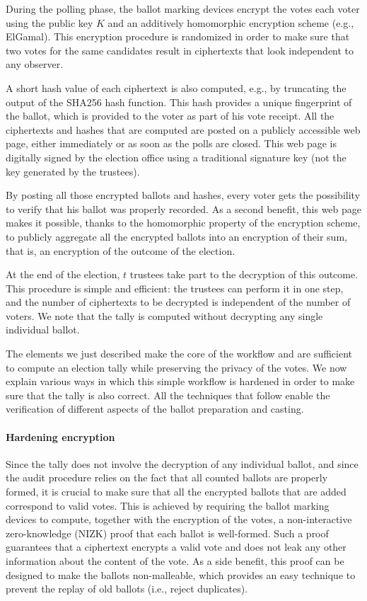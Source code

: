 \documentclass[letterpaper, 10pt, twocolumn]{article}
\begin{document}
During the polling phase, the ballot marking devices encrypt the votes
each voter using the public key $K$ and an additively homomorphic
encryption scheme (e.g., ElGamal). This encryption procedure is
randomized in order to make sure that two votes for the same
candidates result in ciphertexts that look independent to any
observer. 

A short hash value of each ciphertext is also computed, e.g., by
truncating the output of the SHA256 hash function.  This hash provides
a unique fingerprint of the ballot, which is provided to the voter as
part of his vote receipt. All the ciphertexts and hashes that are
computed are posted on a publicly accessible web page, either
immediately or as soon as the polls are closed. This web page is
digitally signed by the election office using a traditional signature
key (not the key generated by the trustees).

By posting all those encrypted ballots and hashes, every voter gets
the possibility to verify that his ballot was properly recorded. As a
second benefit, this web page makes it possible, thanks to the
homomorphic property of the encryption scheme, to publicly aggregate
all the encrypted ballots into an encryption of their sum, that is, an
encryption of the outcome of the election.

At the end of the election, $t$ trustees take part to the decryption
of this outcome. This procedure is simple and efficient: the trustees
can perform it in one step, and the number of ciphertexts to be
decrypted is independent of the number of voters. We note that the
tally is computed without decrypting any single individual ballot.

The elements we just described make the core of the workflow and are
sufficient to compute an election tally while preserving the privacy
of the votes. We now explain various ways in which this simple
workflow is hardened in order to make sure that the tally is also
correct. All the techniques that follow enable the verification of
different aspects of the ballot preparation and casting.

\paragraph{Hardening encryption}
\label{sec:hardening-encryption}
Since the tally does not involve the decryption of any individual
ballot, and since the audit procedure relies on the fact that all
counted ballots are properly formed, it is crucial to make sure that
all the encrypted ballots that are added correspond to valid votes.
This is achieved by requiring the ballot marking devices to compute,
together with the encryption of the votes, a non-interactive
zero-knowledge (NIZK) proof that each ballot is well-formed. Such a
proof guarantees that a ciphertext encrypts a valid vote and does not
leak any other information about the content of the vote. As a side
benefit, this proof can be designed to make the ballots non-malleable,
which provides an easy technique to prevent the replay of old ballots
(i.e., reject duplicates).
\end{document}
